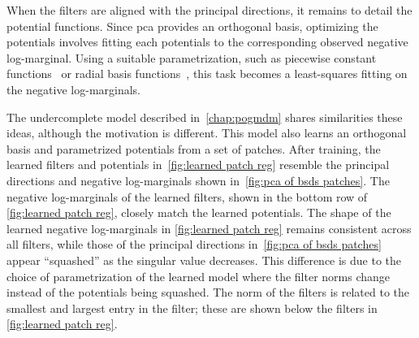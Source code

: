 When the filters are aligned with the principal directions, it remains to detail the potential functions.
Since \gls{pca} provides an orthogonal basis, optimizing the potentials involves fitting each potentials to the corresponding observed negative log-marginal.
Using a suitable parametrization, such as piecewise constant functions~\cite{zhu_filters_1998} or radial basis functions~\cite{chen_trainable_2017}, this task becomes a least-squares fitting on the negative log-marginals.

The undercomplete model described in~\cref{chap:pogmdm} shares similarities these ideas, although the motivation is different.
This model also learns an orthogonal basis and parametrized potentials from a set of patches.
After training, the learned filters and potentials in~\cref{fig:learned patch reg} resemble the principal directions and negative log-marginals shown in~\cref{fig:pca of bsds patches}.
The negative log-marginals of the learned filters, shown in the bottom row of \cref{fig:learned patch reg}, closely match the learned potentials.
The shape of the learned negative log-marginals in \cref{fig:learned patch reg} remains consistent across all filters, while those of the principal directions in~\cref{fig:pca of bsds patches} appear \enquote{squashed} as the singular value decreases.
This difference is due to the choice of parametrization of the learned model where the filter norms change instead of the potentials being squashed.
The norm of the filters is related to the smallest and largest entry in the filter; these are shown below the filters in \cref{fig:learned patch reg}.
